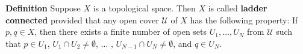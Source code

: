 \documentclass[12pt]{article}
\newcounter{123listctr}
\newcounter{123listcolonstylectr}
\begin{document}
{\bf Definition}
Suppose $X$ is a topological space. Then 
$X$ is called {\bf ladder connected} provided that any 
open cover $\mathcal{U}$ of $X$ has the following property: 
If $p,q\in X$, then there exists a finite number of
open sets $U_1,\ldots, U_N$ from $\mathcal{U}$ such that 
$p\in U_1$, $U_1\cap U_2\neq \emptyset$, $\ldots$ , $U_{N-1}\cap U_N\neq\emptyset$,
and $q\in U_N$.
\end{document}
